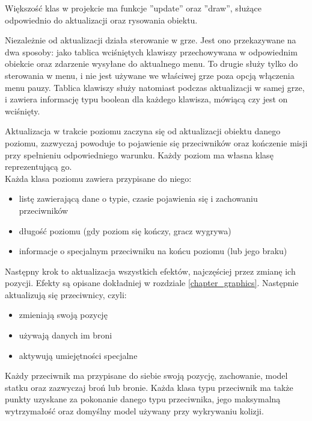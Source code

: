 Większo\'sć klas w projekcie ma funkcje ''update'' oraz ''draw'', służące odpowiednio do aktualizacji oraz rysowania obiektu.

Niezależnie od aktualizacji działa sterowanie w grze. Jest ono przekazywane na dwa sposoby: jako tablica wci\'sniętych klawiszy przechowywana w odpowiednim obiekcie oraz zdarzenie wysyłane do aktualnego menu. To drugie służy tylko do sterowania w menu, i nie jest używane we wła\'sciwej grze poza opcją włączenia menu pauzy. Tablica klawiszy służy natomiast podczas aktualizacji w samej grze, i zawiera informację typu boolean dla każdego klawisza, mówiącą czy jest on wci\'snięty.\bigskip


Aktualizacja w trakcie poziomu zaczyna się od aktualizacji obiektu danego poziomu, zazwyczaj powoduje to pojawienie się przeciwników oraz kończenie misji przy spełnieniu odpowiedniego warunku. Każdy poziom ma własna klasę reprezentującą go.\\
Każda klasa poziomu zawiera przypisane do niego: \begin{itemize}[topsep=0.2em, itemsep=0.5em, partopsep=0em, parsep=0em]
	\item listę zawierającą dane o typie, czasie pojawienia się i zachowaniu przeciwników
	\item długo\'sć poziomu (gdy poziom się kończy, gracz wygrywa)
	\item informacje o specjalnym przeciwniku na końcu poziomu (lub jego braku)
\end{itemize}\smallskip

\noindent Następny krok to aktualizacja wszystkich efektów, najczę\'sciej przez zmianę ich pozycji. Efekty są opisane dokładniej w rozdziale \ref{chapter_graphics}.\newpage
\noindent Następnie aktualizują się przeciwnicy, czyli:\begin{itemize}[topsep=0.2em, itemsep=0.5em, partopsep=0em, parsep=0em]
	\item zmieniają swoją pozycję
	\item używają danych im broni
	\item aktywują umiejętno\'sci specjalne
\end{itemize}
Każdy przeciwnik ma przypisane do siebie swoją pozycję, zachowanie, model statku oraz zazwyczaj broń lub bronie. Każda klasa typu przeciwnik ma także punkty uzyskane za pokonanie danego typu przeciwnika, jego maksymalną wytrzymało\'sć  oraz domy\'slny model używany przy wykrywaniu kolizji.\smallskip

